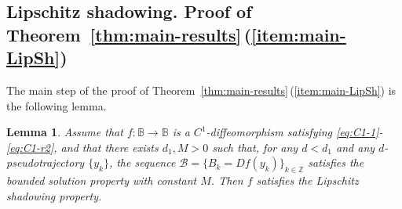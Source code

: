 \documentclass[12pt]{article}
\newcommand{\Bb}{\mathbb{B}}
\newcommand{\Zz}{\mathbb{Z}}
\newtheorem{lem}[thm]{Lemma}
\theoremstyle{definition}
\begin{document}
\subsection{Lipschitz shadowing. Proof of Theorem~\ref{thm:main-results}\,(\ref{item:main-LipSh})}\label{sec:proofLipSh}

The main step of the proof of Theorem~\ref{thm:main-results}\,(\ref{item:main-LipSh}) is the following lemma.

\begin{lem}\label{lem:BS-SH}
Assume that $f:\Bb\to\Bb$ is a $C^1$-diffeomorphism satisfying \eqref{eq:C1-1}-\eqref{eq:C1-r2}, and that there exists $d_1, M > 0$ such that, for any $d < d_1$ and any $d$-pseudotrajectory $\{y_k\}$, the sequence ${\mathcal{B}} = \{B_k = Df(y_k)\}_{k \in \Zz}$ satisfies the bounded solution property with constant $M$. Then $f$ satisfies the Lipschitz shadowing property. 
\end{lem}
\end{document}
